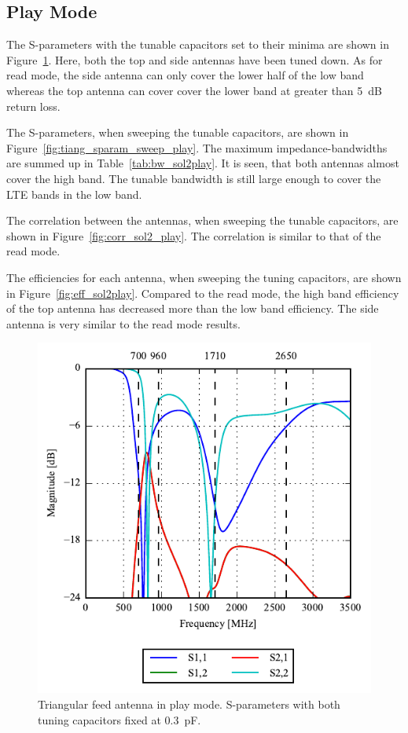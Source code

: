 \FloatBarrier
\subsection{Play Mode}

The S-parameters with the tunable capacitors set to their minima are shown in Figure~\ref{fig:triang_sparam_play}. Here, both the top and side antennas have been tuned down. As for read mode, the side antenna can only cover the lower half of the low band whereas the top antenna can cover cover the lower band at greater than \SI{5}{dB} return loss.

The S-parameters, when sweeping the tunable capacitors, are shown in Figure~\ref{fig:tiang_sparam_sweep_play}. The maximum impedance-bandwidths are summed up in Table~\ref{tab:bw_sol2play}. It is seen, that both antennas almost cover the high band. The tunable bandwidth is still large enough to cover the LTE bands in the low band.

The correlation between the antennas, when sweeping the tunable capacitors, are shown in Figure~\ref{fig:corr_sol2_play}. The correlation is similar to that of the read mode.

The efficiencies for each antenna, when sweeping the tuning capacitors, are shown in Figure~\ref{fig:eff_sol2play}. Compared to the read mode, the high band efficiency of the top antenna has decreased more than the low band efficiency. The side antenna is very similar to the read mode results.

\begin{figure}[htbp]
    \centering
    \includegraphics{img/tech_sol/trianglefeed/play_mode/sparams.pdf}
    \caption{Triangular feed antenna in play mode. S-parameters with both tuning capacitors fixed at \SI{0.3}{pF}.}
    \label{fig:triang_sparam_play}
\end{figure}

